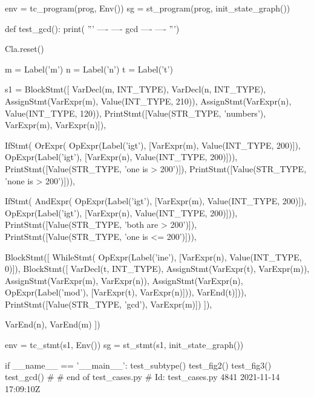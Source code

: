\begin{dispPy}
    env = tc_program(prog, Env())
    sg = st_program(prog, init_state_graph())


def test_gcd():
    print(
'''
----
---- gcd ----
----
''')

    Cla.reset()

    m = Label('m')
    n = Label('n')
    t = Label('t')

    s1 = BlockStmt([
        VarDecl(m, INT_TYPE),
        VarDecl(n, INT_TYPE),
        AssignStmt(VarExpr(m), Value(INT_TYPE, 210)),
        AssignStmt(VarExpr(n), Value(INT_TYPE, 120)),
        PrintStmt([Value(STR_TYPE, 'numbers'), VarExpr(m), VarExpr(n)]),

        IfStmt(
            OrExpr(
                OpExpr(Label('igt'), [VarExpr(m), Value(INT_TYPE, 200)]),
                OpExpr(Label('igt'), [VarExpr(n), Value(INT_TYPE, 200)])),
            PrintStmt([Value(STR_TYPE, 'one is > 200')]),
            PrintStmt([Value(STR_TYPE, 'none is > 200')])),

        IfStmt(
            AndExpr(
                OpExpr(Label('igt'), [VarExpr(m), Value(INT_TYPE, 200)]),
                OpExpr(Label('igt'), [VarExpr(n), Value(INT_TYPE, 200)])),
            PrintStmt([Value(STR_TYPE, 'both are > 200')]),
            PrintStmt([Value(STR_TYPE, 'one is <= 200')])),

        BlockStmt([
            WhileStmt(
                OpExpr(Label('ine'), [VarExpr(n), Value(INT_TYPE, 0)]),
                BlockStmt([
                    VarDecl(t, INT_TYPE),
                    AssignStmt(VarExpr(t), VarExpr(m)),
                    AssignStmt(VarExpr(m), VarExpr(n)),
                    AssignStmt(VarExpr(n), OpExpr(Label('mod'), [VarExpr(t), VarExpr(n)])),
                    VarEnd(t)])),
            PrintStmt([Value(STR_TYPE, 'gcd'), VarExpr(m)])
        ]),

        VarEnd(n),
        VarEnd(m)
        ])

    env = tc_stmt(s1, Env())
    sg = st_stmt(s1, init_state_graph())


if __name__ == '__main__':
    test_subtype()
    test_fig2()
    test_fig3()
    test_gcd()
#
# end of test\_cases.py
# Id: test\_cases.py 4841 2021-11-14 17:09:10Z 
\end{dispPy}

\endinput
